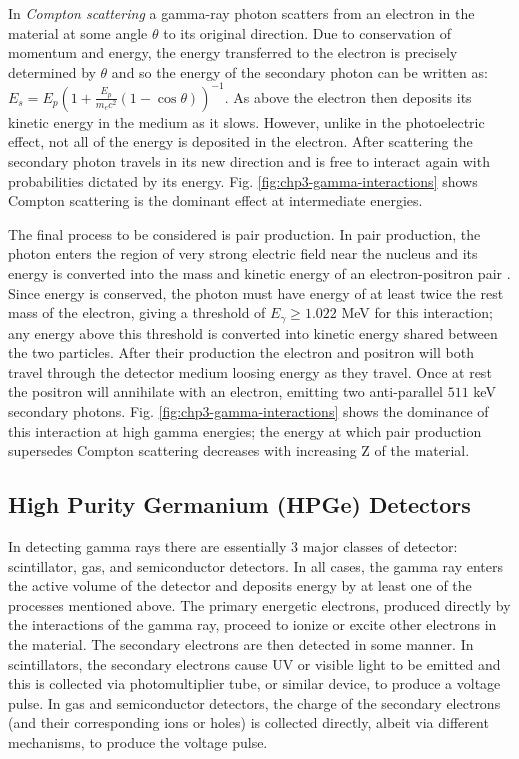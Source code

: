 In \emph{Compton scattering} a gamma-ray photon scatters from an electron in the material at some angle $\theta$ to its original direction\cite{Compton-PhysRev.21.483}. Due to conservation of momentum and energy, the energy transferred to the electron is precisely determined by $\theta$ and so the energy of the secondary photon can be written as: $E_{s}=E_{p}(1+\frac{E_{p}}{m_{e}c^2}(1-\cos\theta))^{-1}$. As above the electron then deposits its kinetic energy in the medium as it slows. However, unlike in the photoelectric effect, not all of the energy is deposited in the electron. After scattering the secondary photon travels in its new direction and is free to interact again with probabilities dictated by its energy. Fig. \ref{fig:chp3-gamma-interactions} shows Compton scattering is the dominant effect at intermediate energies.

The final process to be considered is pair production. In pair production, the photon enters the region of very strong electric field near the nucleus and its energy is converted into the mass and kinetic energy of an electron-positron pair \cite{anderson-PhysRev.43.491,oppenheimer_PhysRev.44.53.2}. Since energy is conserved, the photon must have energy of at least twice the rest mass of the electron, giving a threshold of $E_{\gamma}\geq1.022$ MeV for this interaction; any energy above this threshold is converted into kinetic energy shared between the two particles. After their production the electron and positron will both travel through the detector medium loosing energy as they travel. Once at rest the positron will annihilate with an electron, emitting two anti-parallel $511$ keV secondary photons. Fig. \ref{fig:chp3-gamma-interactions} shows the dominance of this interaction at high gamma energies; the energy at which pair production supersedes Compton scattering decreases with increasing Z of the material.

\subsection{High Purity Germanium (HPGe) Detectors}
\label{ssec:exp-pr-gamma-spec-hpge}
In detecting gamma rays there are essentially 3 major classes of detector: scintillator, gas, and semiconductor detectors. In all cases, the gamma ray enters the active volume of the detector and deposits energy by at least one of the processes mentioned above. The primary energetic electrons, produced directly by the interactions of the gamma ray, proceed to ionize or excite other electrons in the material. The secondary electrons are then detected in some manner. In scintillators, the secondary electrons cause UV or visible light to be emitted and this is collected via photomultiplier tube, or similar device, to produce a voltage pulse. In gas and semiconductor detectors, the charge of the secondary electrons (and their corresponding ions or holes) is collected directly, albeit via different mechanisms, to produce the voltage pulse.

